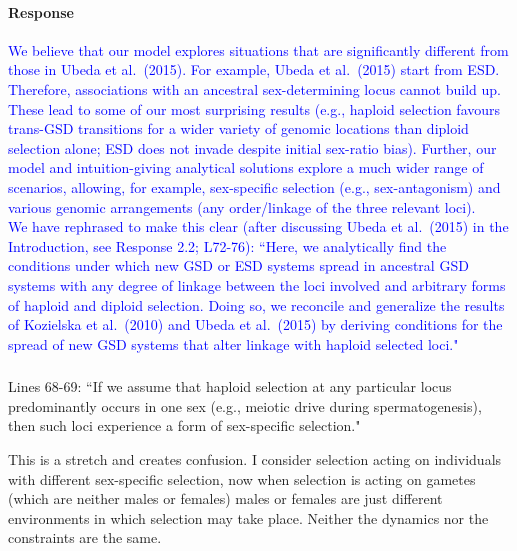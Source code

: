 \documentclass[10pt,letterpaper]{article}
\begin{document}
\noindent\paragraph{Response}
\textcolor{blue}{
We believe that our model explores situations that are significantly different from those in Ubeda et al.\ (2015). 
For example, Ubeda et al.\ (2015) start from ESD. 
Therefore, associations with an ancestral sex-determining locus cannot build up. 
These lead to some of our most surprising results (e.g., haploid selection favours trans-GSD transitions for a wider variety of genomic locations than diploid selection alone; ESD does not invade despite initial sex-ratio bias).
Further, our model and intuition-giving analytical solutions explore a much wider range of scenarios, allowing, for example, sex-specific selection (e.g., sex-antagonism) and various genomic arrangements (any order/linkage of the three relevant loci).
\\
\indent
We have rephrased to make this clear (after discussing Ubeda et al.\ (2015) in the Introduction, see Response 2.2; L72-76): ``Here, we analytically find the conditions under which new GSD or ESD systems spread in ancestral GSD systems with any degree of linkage between the loci involved and arbitrary forms of haploid and diploid selection. 
Doing so, we reconcile and generalize the results of Kozielska et al.\ (2010) and Ubeda et al.\ (2015) by deriving conditions for the spread of new GSD systems that alter linkage with haploid selected loci."
}

\noindent\subsubsection{}
Lines 68-69: ``If we assume that haploid selection at any particular locus predominantly occurs in one sex (e.g., meiotic drive during spermatogenesis), then such loci experience a form of sex-specific selection." 

This is a stretch and creates confusion. I consider selection acting on individuals with different sex-specific selection, now when selection is acting on gametes (which are neither males or females) males or females are just different environments in which selection may take place. Neither the dynamics nor the constraints are the same. 
\end{document}
